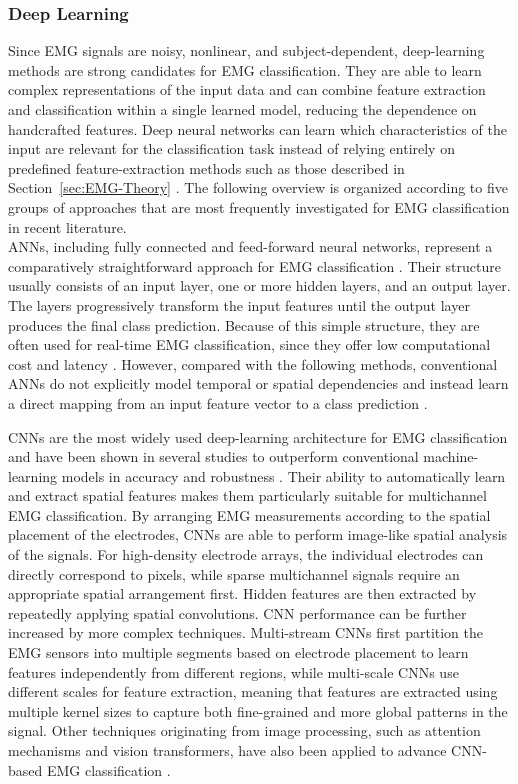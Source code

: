 \subsubsection{Deep Learning}
\label{sec:emgDL}

Since EMG signals are noisy, nonlinear, and subject-dependent, deep-learning methods are strong candidates for EMG classification. They are able to learn complex representations of the input data and can combine feature extraction and classification within a single learned model, reducing the dependence on handcrafted features. Deep neural networks can learn which characteristics of the input are relevant for the classification task instead of relying entirely on predefined feature-extraction methods such as those described in Section~\ref{sec:EMG-Theory} \cite{zhong_deep_2026}. The following overview is organized according to five groups of approaches that are most frequently investigated for EMG classification in recent literature.\\

\ac{ANN}s, including fully connected and feed-forward neural networks, represent a comparatively straightforward approach for EMG classification \cite{li_gesture_2021}. Their structure usually consists of an input layer, one or more hidden layers, and an output layer. The layers progressively transform the input features until the output layer produces the final class prediction. Because of this simple structure, they are often used for real-time EMG classification, since they offer low computational cost and latency \cite{zhang_real-time_2019}. However, compared with the following methods, conventional ANNs do not explicitly model temporal or spatial dependencies and instead learn a direct mapping from an input feature vector to a class prediction \cite{li_gesture_2021}.

\acp{CNN} are the most widely used deep-learning architecture for EMG classification and have been shown in several studies to outperform conventional machine-learning models in accuracy and robustness \cite{li_gesture_2021}. Their ability to automatically learn and extract spatial features makes them particularly suitable for multichannel EMG classification. By arranging EMG measurements according to the spatial placement of the electrodes, \ac{CNN}s are able to perform image-like spatial analysis of the signals. For high-density electrode arrays, the individual electrodes can directly correspond to pixels, while sparse multichannel signals require an appropriate spatial arrangement first. Hidden features are then extracted by repeatedly applying spatial convolutions. \ac{CNN} performance can be further increased by more complex techniques. Multi-stream CNNs first partition the EMG sensors into multiple segments based on electrode placement to learn features independently from different regions, while multi-scale \acp{CNN} use different scales for feature extraction, meaning that features are extracted using multiple kernel sizes to capture both fine-grained and more global patterns in the signal. Other techniques originating from image processing, such as attention mechanisms and vision transformers, have also been applied to advance CNN-based EMG classification \cite{zhong_deep_2026}.

